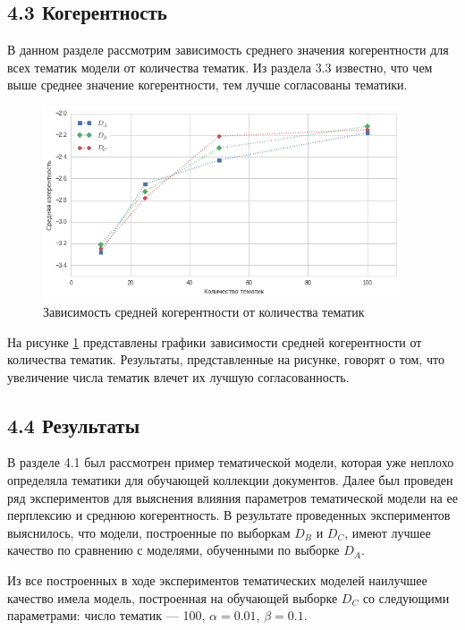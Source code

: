 \documentclass[a4paper]{report}
\begin{document}
	\subsection{4.3 Когерентность}
	
	В данном разделе рассмотрим зависимость среднего значения когерентности для всех тематик модели от количества тематик. Из раздела 3.3 известно, что чем выше среднее значение когерентности, тем лучше согласованы тематики.
	
	\begin{figure}[h]
		\centering
		\includegraphics[width=400px]
		{imgs/CoherenceTopic.png}
		\caption{ Зависимость средней когерентности от количества тематик }
		\label{fig:coherence}
	\end{figure}
	
	На рисунке \ref{fig:coherence} представлены графики зависимости средней когерентности от количества тематик. Результаты, представленные на рисунке, говорят о том, что увеличение числа тематик влечет их лучшую согласованность.
	
	 \subsection{4.4 Результаты} 
	 
	 В разделе 4.1 был рассмотрен пример тематической модели, которая уже неплохо определяла тематики для обучающей коллекции документов. Далее был проведен ряд экспериментов для выяснения влияния параметров тематической модели на ее перплексию и среднюю когерентность. В результате проведенных экспериментов выяснилось, что модели, построенные по выборкам $D_B$ и $D_C$, имеют лучшее качество по сравнению с моделями, обученными по выборке $D_A$. 
	 
	 Из все построенных в ходе экспериментов тематических моделей наилучшее качество имела модель, построенная на обучающей выборке $D_C$ со следующими параметрами: число тематик --- 100, $\alpha = 0.01$, $\beta=0.1$. 
	 
\end{document}
